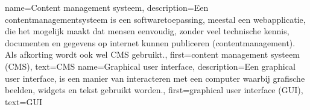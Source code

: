 \makenoidxglossaries

{
    name={Content management systeem},
    description={Een contentmanagementsysteem is een softwaretoepassing,
        meestal een webapplicatie, die het mogelijk maakt dat mensen eenvoudig, zonder veel technische kennis,
        documenten en gegevens op internet kunnen publiceren (contentmanagement).
    Als afkorting wordt ook wel CMS gebruikt.},
    first={content management systeem (CMS)},
    text={CMS}
}
{
    name={Graphical user interface},
    description={Een graphical user interface, is een manier van interacteren met een computer waarbij grafische beelden, widgets en tekst gebruikt worden.},
    first={graphical user interface (GUI)},
    text={GUI}
}
